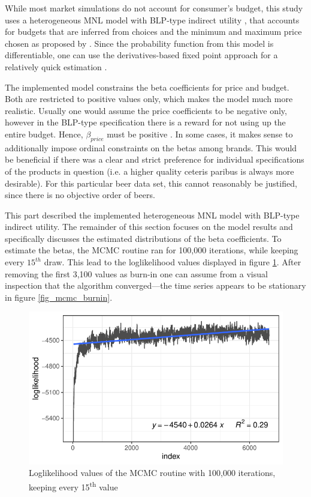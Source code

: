 \documentclass[12pt,a4paper]{article}
\begin{document}
While most market simulations do not account for consumer's budget, this study uses a heterogeneous MNL model with BLP-type indirect utility \citep{berryAutomobilePricesMarket1995}, that accounts for budgets that are inferred from choices and the minimum and maximum price chosen as proposed by \cite{pachaliPerilsIgnoringBudget2017}.
Since the probability function from this model is differentiable, one can use the derivatives-based fixed point approach for a relatively quick estimation \citep{morrowFixedPointApproachesComputing2011a}.

The implemented model constrains the beta coefficients for price and budget.
Both are restricted to positive values only, which makes the model much more realistic.
Usually one would assume the price coefficients to be negative only, however in the BLP-type specification there is a reward for not using up the entire budget. Hence, $\beta_{price}$ must be positive \citep{pachaliPerilsIgnoringBudget2017}.
In some cases, it makes sense to additionally impose ordinal constraints on the betas among brands.
This would be beneficial if there was a clear and strict preference for individual specifications of the products in question (i.e. a higher quality ceteris paribus is always more desirable).
For this particular beer data set, this cannot reasonably be justified, since there is no objective order of beers.

This part described the implemented heterogeneous MNL model with BLP-type indirect utility.
The remainder of this section focuses on the model results and specifically discusses the estimated distributions of the beta coefficients.
To estimate the betas, the MCMC routine ran for 100,000 iterations, while keeping every $15^{th}$ draw.
This lead to the loglikelihood values displayed in figure \ref{fig_mcmc}.
After removing the first 3,100 values as burn-in one can assume from a visual inspection that the algorithm converged---the time series appears to be stationary in figure \ref{fig_mcmc_burnin}.

\begin{figure}[ht]
	\centering
  \includegraphics[scale = 0.8]{figures/mcmc_before_burnin_fitted.pdf}
	\caption{Loglikelihood values of the MCMC routine with 100,000 iterations, keeping every 15\textsuperscript{th} value}
	\label{fig_mcmc}
\end{figure}
\end{document}
